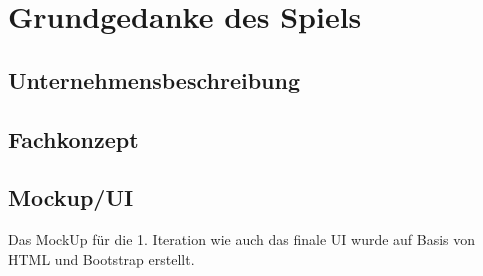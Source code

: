 \clearpage
\chapter{Grundgedanke des Spiels}
\section{Unternehmensbeschreibung}

\section{Fachkonzept}
\section{Mockup/UI}
Das MockUp für die 1. Iteration wie auch das finale UI wurde auf Basis von HTML und Bootstrap erstellt. 
